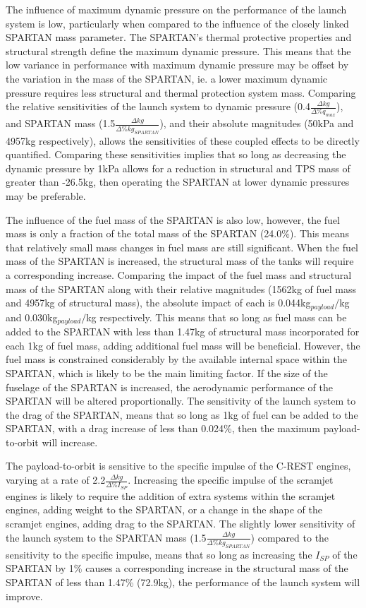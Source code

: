 The influence of maximum dynamic pressure on the performance of the launch system is low, particularly when compared to the influence of the closely linked SPARTAN mass parameter. The SPARTAN's thermal protective properties and structural strength define the maximum dynamic pressure. This means that the low variance in performance with maximum dynamic pressure may be offset by the variation in the mass of the SPARTAN, ie. a lower maximum dynamic pressure requires less structural and thermal protection system mass.
 Comparing the relative sensitivities of the launch system to dynamic pressure (0.4$\frac{\Delta kg}{\Delta\%q_{max}}$), and SPARTAN mass (1.5$\frac{\Delta kg}{\Delta\%kg_{SPARTAN}}$), and their absolute magnitudes (50kPa and 4957kg respectively), allows the sensitivities of these coupled effects to be directly quantified. Comparing these sensitivities implies that so long as decreasing the dynamic pressure by 1kPa allows for a reduction in structural and TPS mass of greater than -26.5kg, then operating the SPARTAN at lower dynamic pressures may be preferable. 

The influence of the fuel mass of the SPARTAN is also low, however, the fuel mass is only a fraction of the total mass of the SPARTAN (24.0\%). This means that relatively small mass changes in fuel mass are still significant. 
When the fuel mass of the SPARTAN is increased, the structural mass of the tanks will require a corresponding increase. 
Comparing the impact of the fuel mass and structural mass of the SPARTAN along with their relative magnitudes (1562kg of fuel mass and 4957kg of structural mass), the absolute impact of each is 0.044kg$_{payload}/$kg and 0.030kg$_{payload}/$kg respectively. This means that so long as fuel mass can be added to the SPARTAN with less than 1.47kg of structural mass incorporated for each 1kg of fuel mass, adding additional fuel mass will be beneficial. However, the fuel mass is constrained considerably by the available internal space within the SPARTAN, which is likely to be the main limiting factor.
If the size of the fuselage of the SPARTAN is increased, the aerodynamic performance of the SPARTAN will be altered proportionally. 
The sensitivity of the launch system to the drag of the SPARTAN, means that so long as 1kg of fuel can be added to the SPARTAN, with a drag increase of less than 0.024\%, then the maximum payload-to-orbit will increase. 


The payload-to-orbit is sensitive to the specific impulse of the C-REST engines, varying at a rate of 2.2$\frac{\Delta kg}{\Delta\%I_{SP}}$. Increasing the specific impulse of the scramjet engines is likely to require the addition of extra systems within the scramjet engines, adding weight to the SPARTAN, or a change in the shape of the scramjet engines, adding drag to the SPARTAN. 
The slightly lower sensitivity of the launch system to the SPARTAN mass (1.5$\frac{\Delta kg}{\Delta\%kg_{SPARTAN}}$) compared to the sensitivity to the specific impulse, means that so long as increasing the $I_{SP}$ of the SPARTAN by 1\% causes a corresponding increase in the structural mass of the SPARTAN of less than 1.47\% (72.9kg), the performance of the launch system will improve. 

